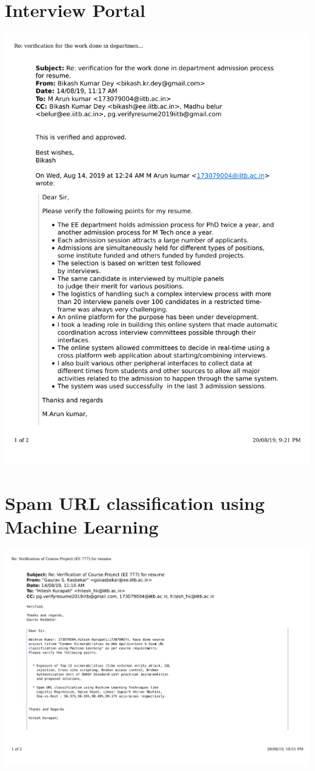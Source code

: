 \documentclass{article}
\begin{document}
\section{Interview Portal}
	\includegraphics[page=1, scale=0.5]{proofs/Interview_portal.pdf}\\
\section{ Spam URL classification using Machine Learning}
	\includegraphics[page=1, scale=0.5]{proofs/spam_url.pdf}\\
\end{document}
